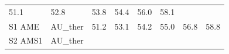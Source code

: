 \documentclass[]{article}
\begin{document}
\begin{longtable}[]{@{}llrrrrrr@{}}
\begin{minipage}[t]{0.09\columnwidth}
51.1\strut
\end{minipage} & \begin{minipage}[t]{0.09\columnwidth}\raggedleft\strut
52.8\strut
\end{minipage} & \begin{minipage}[t]{0.09\columnwidth}\raggedleft\strut
53.8\strut
\end{minipage} & \begin{minipage}[t]{0.09\columnwidth}\raggedleft\strut
54.4\strut
\end{minipage} & \begin{minipage}[t]{0.09\columnwidth}\raggedleft\strut
56.0\strut
\end{minipage} & \begin{minipage}[t]{0.09\columnwidth}\raggedleft\strut
58.1\strut
\end{minipage}\tabularnewline
\begin{minipage}[t]{0.14\columnwidth}\raggedright\strut
S1 AME\strut
\end{minipage} & \begin{minipage}[t]{0.13\columnwidth}\raggedright\strut
AU\_ther\strut
\end{minipage} & \begin{minipage}[t]{0.09\columnwidth}\raggedleft\strut
51.2\strut
\end{minipage} & \begin{minipage}[t]{0.09\columnwidth}\raggedleft\strut
53.1\strut
\end{minipage} & \begin{minipage}[t]{0.09\columnwidth}\raggedleft\strut
54.2\strut
\end{minipage} & \begin{minipage}[t]{0.09\columnwidth}\raggedleft\strut
55.0\strut
\end{minipage} & \begin{minipage}[t]{0.09\columnwidth}\raggedleft\strut
56.8\strut
\end{minipage} & \begin{minipage}[t]{0.09\columnwidth}\raggedleft\strut
58.8\strut
\end{minipage}\tabularnewline
\begin{minipage}[t]{0.14\columnwidth}\raggedright\strut
S2 AMS1\strut
\end{minipage} & \begin{minipage}[t]{0.13\columnwidth}\raggedright\strut
AU\_ther\strut
\end{minipage} & \begin{minipage}[t]{0.09\columnwidth}\raggedleft\strut

\end{minipage}
\end{longtable}
\end{document}
